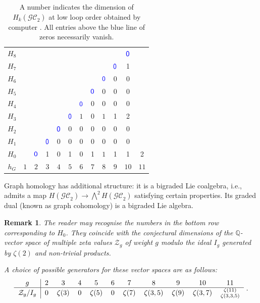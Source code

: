 \documentclass[12pt]{amsart}
\newcommand{\QQ}{{\mathbb Q}}
\theoremstyle{plain}
\newtheorem{remark}[thm]{Remark}
\newcommand{\GC}{\mathcal{GC}}
\newcommand{\0}{\color{blue}{\mathsf{0}}}
\begin{document}
 
\begin{table}[h]
\begin{center}
\vspace{0.1in} 
\begin{tabular}{c|ccccccccccc}
$H_8$ &&&&&&&&&& $\0$   \\
$H_7$ &&&&&&&&& $\0$& 1   \\
$H_6$ &&&&&&&& $\0$ & 0& 0 \\
$H_5$ &&&&&&& $\0$ &  0 & 0& 0 \\
$H_4$ &&&&&&  $\0$ &  0 &  0& 0 &0\\
$H_3$ &&&&& $\0$ & $1$   & 0&  $1$ &1 &  2  \\
$H_2$ &&&& $\0$ & 0&0 & 0 & 0  & 0 & 0 \\
$H_1$ &&& $\0$ & 0 & 0 & 0 & 0 & 0 & 0 &  0 \\
$H_0$ && $\0$ & 1  & 0& 1 &0  & 1  &   $1 $ & 1 & 1 &  2\\ 
\hline  
$h_G$ & $1$  & $2$ & $3$ & $4$ & $5$ & $6$ & $7$ & $8$& $9$& $10$ & $11$
\end{tabular}
\vspace{0.2in} 
\end{center}
\caption{A number indicates the dimension of $H_k(\GC_2)$ at low loop order obtained by computer \cite{GraphComplexComputations, GraphComplexComputations24}.  All entries above the blue line of zeros necessarily vanish.  
 } 
\label{default}\label{table:knownresults} 
\end{table}

Graph homology has additional structure: it is a bigraded Lie coalgebra, i.e., admits a map $H(\GC_2) \rightarrow \bigwedge^2 H(\GC_2)$ satisfying certain properties. Its graded dual (known as graph cohomology) is a bigraded Lie algebra.

\begin{remark}
 The reader may recognise the numbers in the bottom row corresponding to $H_0$. They coincide with the conjectural dimensions of the  $\QQ$-vector space of multiple zeta values $\mathcal{Z}_g$ of weight $g$ modulo the ideal $I_g$ generated by   $\zeta(2)$ and non-trivial products.  
 
 A   choice of possible generators for these vector spaces are as follows:
\[ \begin{tabular}{c|ccccccccccc}
$g$ &  $2$ & $3$ & $4$ & $5$ & $6$ & $7$ & $8$& $9$& $10$ & $11$  \\
\hline
$\mathcal{Z}_g/I_g$ & $0$ & $\zeta(3)$  & $0$& $\zeta(5)$ & $0$  & $\zeta(7)$  & $\zeta(3,5)$&    $ \zeta(9) $ & $\zeta(3,7)$ & $\substack{ \zeta(11) \\ \zeta(3,3,5)}$ \\ 
\end{tabular} \ . 
\]

  \end{remark} 
\end{document}
